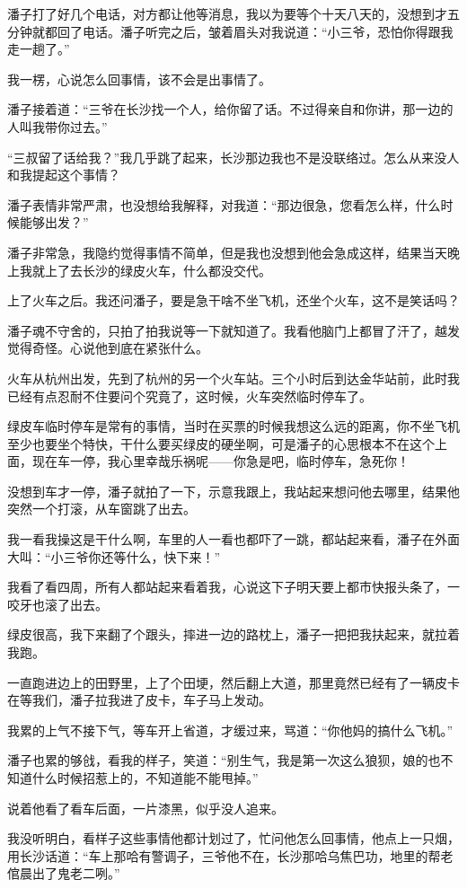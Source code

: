 潘子打了好几个电话，对方都让他等消息，我以为要等个十天八天的，没想到才五分钟就都回了电话。潘子听完之后，皱着眉头对我说道：“小三爷，恐怕你得跟我走一趟了。”

我一楞，心说怎么回事情，该不会是出事情了。

潘子接着道：“三爷在长沙找一个人，给你留了话。不过得亲自和你讲，那一边的人叫我带你过去。”

“三叔留了话给我？”我几乎跳了起来，长沙那边我也不是没联络过。怎么从来没人和我提起这个事情？

潘子表情非常严肃，也没想给我解释，对我道：“那边很急，您看怎么样，什么时候能够出发？”

潘子非常急，我隐约觉得事情不简单，但是我也没想到他会急成这样，结果当天晚上我就上了去长沙的绿皮火车，什么都没交代。

上了火车之后。我还问潘子，要是急干啥不坐飞机，还坐个火车，这不是笑话吗？

潘子魂不守舍的，只拍了拍我说等一下就知道了。我看他脑门上都冒了汗了，越发觉得奇怪。心说他到底在紧张什么。

火车从杭州出发，先到了杭州的另一个火车站。三个小时后到达金华站前，此时我已经有点忍耐不住要问个究竟了，这时候，火车突然临时停车了。

绿皮车临时停车是常有的事情，当时在买票的时候我想这么远的距离，你不坐飞机至少也要坐个特快，干什么要买绿皮的硬坐啊，可是潘子的心思根本不在这个上面，现在车一停，我心里幸哉乐祸呢——你急是吧，临时停车，急死你！

没想到车才一停，潘子就拍了一下，示意我跟上，我站起来想问他去哪里，结果他突然一个打滚，从车窗跳了出去。

我一看我操这是干什么啊，车里的人一看也都吓了一跳，都站起来看，潘子在外面大叫：“小三爷你还等什么，快下来！”

我看了看四周，所有人都站起来看着我，心说这下子明天要上都市快报头条了，一咬牙也滚了出去。

绿皮很高，我下来翻了个跟头，摔进一边的路枕上，潘子一把把我扶起来，就拉着我跑。

一直跑进边上的田野里，上了个田埂，然后翻上大道，那里竟然已经有了一辆皮卡在等我们，潘子拉我进了皮卡，车子马上发动。

我累的上气不接下气，等车开上省道，才缓过来，骂道：“你他妈的搞什么飞机。”

潘子也累的够戗，看我的样子，笑道：“别生气，我是第一次这么狼狈，娘的也不知道什么时候招惹上的，不知道能不能甩掉。”

说着他看了看车后面，一片漆黑，似乎没人追来。

我没听明白，看样子这些事情他都计划过了，忙问他怎么回事情，他点上一只烟，用长沙话道：“车上那哈有警调子，三爷他不在，长沙那哈乌焦巴功，地里的帮老倌晨出了鬼老二咧。”

